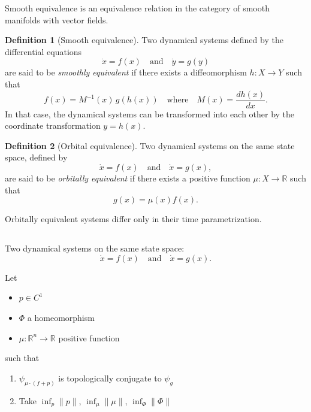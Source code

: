 \documentclass{article}
\theoremstyle{definition} \newtheorem{definition}{Definition}  \newtheorem{example}{Example}
\theoremstyle{remark} \newtheorem{remark}{Remark}
\newcommand{\reals}{\mathbb{R}}
\newcounter{ct}
\begin{document}
Smooth equivalence is an equivalence relation in the category of smooth manifolds with vector fields. %
\begin{definition}[Smooth equivalence]\label{def:smooth_equivalence}
Two dynamical systems defined by the differential equations 
\[
\dot{x} = f(x) \quad \text{and} \quad \dot{y} = g(y)
\]
are said to be \emph{smoothly equivalent} if there exists a diffeomorphism \( h \colon X \to Y \) such that
\[
f(x) = M^{-1}(x) \, g(h(x)) \quad \text{where} \quad M(x) = \frac{d h(x)}{d x}.
\]
In that case, the dynamical systems can be transformed into each other by the coordinate transformation \( y = h(x) \).
\end{definition}

\begin{definition}[Orbital equivalence]
Two dynamical systems on the same state space, defined by 
\[
\dot{x} = f(x) \quad \text{and} \quad \dot{x} = g(x),
\]
are said to be \emph{orbitally equivalent} if there exists a positive function \( \mu \colon X \to \mathbb{R} \) such that
\[
g(x) = \mu(x) f(x).
\]
\end{definition}
Orbitally equivalent systems differ only in their time parametrization.


\subsection{}
Two dynamical systems on the same state space:
\[
\dot{x} = f(x) \quad \text{and} \quad \dot{x} = g(x).
\]

Let 
\begin{itemize}
\item $p\in C^1$
\item $\Phi$ a homeomorphism
\item $\mu\colon \reals^n\rightarrow \reals$ positive function
\end{itemize}
such that 
\begin{enumerate}
\item $\psi_{\mu \cdot (f+p)}$ is topologically conjugate to $\psi_{g}$
\item Take $\inf_p \|p\|$, $\inf_\mu \|\mu\|$, $\inf_\Phi \|\Phi\|$
\end{enumerate}

\end{document}
